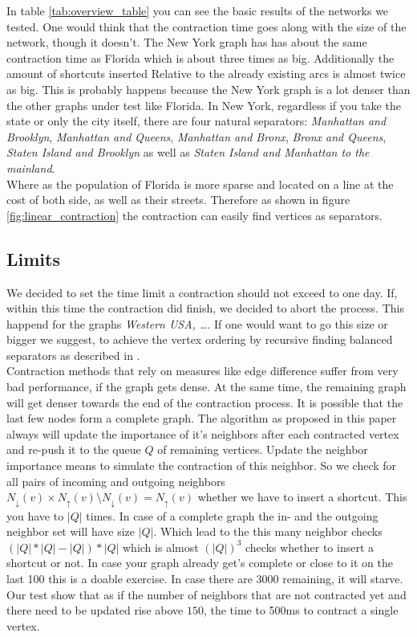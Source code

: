 In table \ref{tab:overview_table} you can see the basic results of the networks we tested. One would think that the contraction time goes along with the size of the network, though it doesn't. The New York graph has has about the same contraction time 
as Florida which is about three times as big. Additionally the amount of shortcuts inserted Relative to the already existing arcs is almost twice as big. This is probably happens because the New York graph is a lot denser than the other graphs under test like Florida.
In New York, regardless if you take the state or only the city itself, there are four natural separators: \textit{Manhattan and Brooklyn}, \textit{Manhattan and Queens}, \textit{Manhattan and Bronx}, \textit{Bronx and Queens}, \textit{Staten Island and Brooklyn} as well as \textit{Staten Island and Manhattan to the mainland}.  
\\ 
Where as the population of Florida is more sparse and located on a line at the cost of both side, as well as their streets. Therefore as shown in figure \ref{fig:linear_contraction} the contraction can easily find vertices as separators. 

\subsection{Limits}

We decided to set the time limit a contraction should not exceed to one day. If, within this time the contraction did finish, we decided to abort the process. This happend for the graphs \textit{Western USA, …}. If one would want to go this size or bigger we suggest,
to achieve the vertex ordering by recursive finding balanced separators as described in \cite[Customization Contraction Hierarchies]{CCH}. 
\\
Contraction methods that rely on measures like edge difference suffer from very bad performance, if the graph gets dense. At the same time, the remaining graph will get denser towards the end of the contraction process. It is possible  that the last few nodes form a complete graph. The algorithm
as proposed in this paper always will update the importance  of it's neighbors  after each contracted vertex and re-push it to the queue $Q$ of remaining vertices. Update the neighbor importance means to simulate the contraction of this neighbor. So we check for all pairs of incoming and outgoing neighbors $N_\downarrow(v) \times N_\uparrow(v) \setminus N_\downarrow(v) = N_\uparrow(v)$ whether we have to insert a shortcut. 
This you have to $|Q|$ times. In case of a complete graph the in- and the outgoing neighbor set will have size $|Q|$. Which lead to the this many neighbor checks $(|Q| * |Q| - |Q|)*|Q|$ which is almost $(|Q|)^3$ checks whether to insert a shortcut or not. In case your graph already get's complete or close to it on the last 
100 this is a doable exercise. In case there are 3000 remaining, it will starve. 
\\
Our test show that as if the number of neighbors that are not contracted yet and there need to be updated rise above $150$, the time to 500ms to contract a single vertex.


